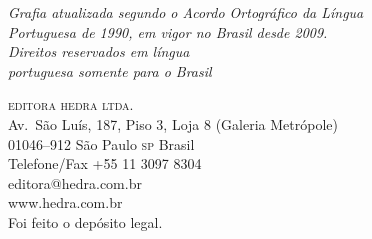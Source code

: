 \bigskip













\vfill

\textit{Grafia atualizada segundo o Acordo Ortográfico da Língua\\
Portuguesa de 1990, em vigor no Brasil desde 2009.}\\

\textit{Direitos reservados em língua\\ 
portuguesa somente para o Brasil}\\\medskip

\textsc{editora hedra ltda.}\\
Av.~São Luís, 187, Piso 3, Loja 8 (Galeria Metrópole)\\
01046--912 São Paulo \textsc{sp} Brasil\\
Telefone/Fax +55 11 3097 8304\\\smallskip
editora@hedra.com.br\\
www.hedra.com.br\\
\bigskip
Foi feito o depósito legal.

\endgroup
\pagebreak